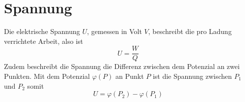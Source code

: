 \documentclass{article}
\begin{document}
 
\section{Spannung}
Die elektrische Spannung $U$, gemessen in Volt $V$, beschreibt die pro Ladung verrichtete Arbeit, also ist
\[
 U = \frac{W}{Q} 
\]
Zudem beschreibt die Spannung die Differenz zwischen dem Potenzial an zwei Punkten. Mit dem Potenzial $\varphi(P)$ an Punkt $P$ ist die Spannung zwischen $P_1$ und $P_2$ somit
\[
 U = \varphi(P_2) - \varphi(P_1) 
\] 
 
\end{document}
